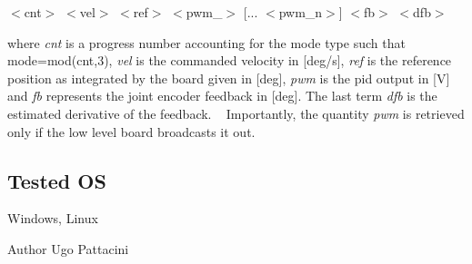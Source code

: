 $<$cnt$>$ $<$vel$>$ $<$ref$>$ $<$pwm\+\_$>$ \mbox{[}... $<$pwm\+\_\+n$>$\mbox{]} $<$fb$>$ $<$dfb$>$

where {\itshape cnt} is a progress number accounting for the mode type such that mode=mod(cnt,3), {\itshape vel} is the commanded velocity in \mbox{[}deg/s\mbox{]}, {\itshape ref} is the reference position as integrated by the board given in \mbox{[}deg\mbox{]}, {\itshape pwm} is the pid output in \mbox{[}V\mbox{]} and {\itshape fb} represents the joint encoder feedback in \mbox{[}deg\mbox{]}. The last term {\itshape dfb} is the estimated derivative of the feedback. ~\newline
 Importantly, the quantity {\itshape pwm} is retrieved only if the low level board broadcasts it out.\hypertarget{group__icub__tld_tested_os_sec}{}\subsection{Tested O\+S}\label{group__icub__tld_tested_os_sec}
Windows, Linux

\begin{DoxyAuthor}{Author}
Ugo Pattacini 
\end{DoxyAuthor}
